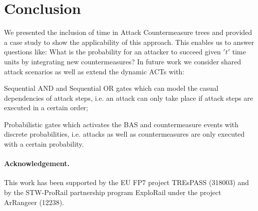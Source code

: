 \documentclass[submission,copyright,creativecommons]{eptcs}
\begin{document}
\section{Conclusion}
We presented the inclusion of time in Attack Countermeasure trees and provided a case study to show the applicability of this approach. This enables us to answer questions like: What is the probability for an attacker to succeed given $'\textit{t}'$ time units by integrating new countermeasures? In future work we consider shared attack scenarios as well as extend the dynamic ACTs with:
\begin{inparaenum}
\item Sequential AND and Sequential OR gates which can model the casual dependencies of attack steps, i.e. an attack can only take place if attack steps are executed in a certain order;
\item  Probabilistic gates which activates the BAS and countermeasure events with discrete probabilities, i.e. attacks as well as countermeasures are only executed with a certain probability.\end{inparaenum}

\paragraph{Acknowledgement.} This work has been supported by the EU FP7 project TREsPASS (318003) and by the STW-ProRail partnership program ExploRail under the project ArRangeer (12238). 



\end{document}
